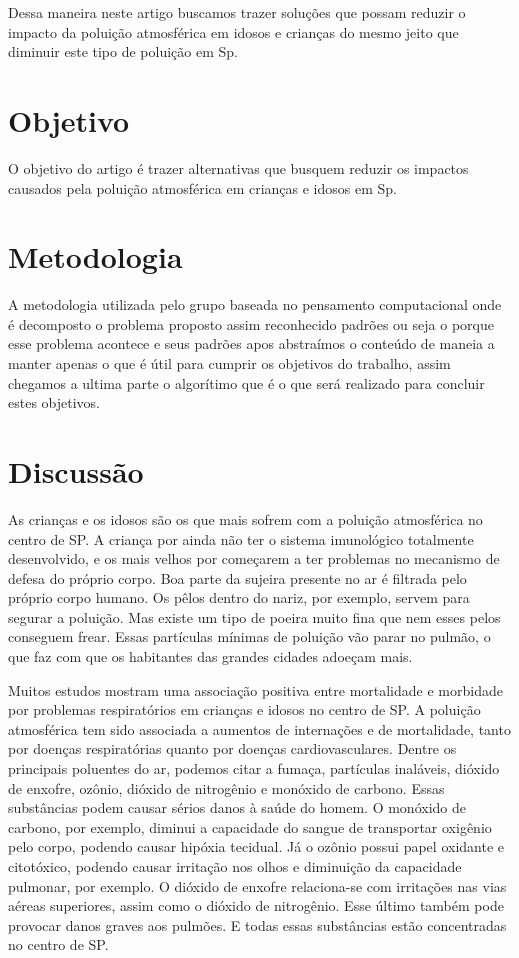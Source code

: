 \documentclass[
	article,			%
	11pt,				%
	oneside,			%
	a4paper,			%
	english,			%
	brazil,				%
	sumario=tradicional
	]{abntex2}
\begin{document}
Dessa maneira neste artigo buscamos trazer soluções que possam reduzir o impacto da poluição atmosférica em idosos e crianças do mesmo jeito que diminuir este tipo de poluição em Sp.


\section{Objetivo}
O objetivo do artigo é trazer alternativas que busquem reduzir os impactos causados pela poluição atmosférica em crianças e idosos em Sp.

\section{Metodologia}
A metodologia utilizada pelo grupo baseada no pensamento computacional onde é decomposto o problema proposto assim reconhecido padrões ou seja o porque esse problema acontece e seus padrões apos abstraímos o conteúdo de maneia a manter apenas o que é útil para cumprir os objetivos do trabalho, assim chegamos a ultima parte o algorítimo que é o que será realizado para concluir estes objetivos.
\section{Discussão}

As crianças e os idosos são os que mais sofrem com a poluição atmosférica no centro de SP. 
A criança por ainda não ter o sistema imunológico totalmente desenvolvido, e os mais velhos por começarem a ter problemas no mecanismo de defesa do próprio corpo. 
Boa parte da sujeira presente no ar é filtrada pelo próprio corpo humano. Os pêlos dentro do nariz, por exemplo, servem para segurar a poluição. Mas existe um tipo de poeira muito fina que nem esses pelos conseguem frear. Essas partículas mínimas de poluição vão parar no pulmão, o que faz com que os habitantes das grandes cidades adoeçam mais.

Muitos estudos mostram uma associação positiva entre mortalidade e morbidade por problemas respiratórios em crianças e idosos no centro de SP.  A poluição atmosférica tem sido associada a aumentos de internações e de mortalidade, tanto por doenças respiratórias quanto por doenças cardiovasculares. Dentre os principais poluentes do ar, podemos citar a fumaça, partículas inaláveis, dióxido de enxofre, ozônio, dióxido de nitrogênio e monóxido de carbono. Essas substâncias podem causar sérios danos à saúde do homem. O monóxido de carbono, por exemplo, diminui a capacidade do sangue de transportar oxigênio pelo corpo, podendo causar hipóxia tecidual. Já o ozônio possui papel oxidante e citotóxico, podendo causar irritação nos olhos e diminuição da capacidade pulmonar, por exemplo. O dióxido de enxofre relaciona-se com irritações nas vias aéreas superiores, assim como o dióxido de nitrogênio. Esse último também pode provocar danos graves aos pulmões. E todas essas substâncias estão concentradas no centro de SP.
\end{document}
